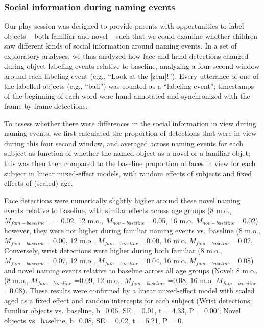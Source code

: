 \documentclass[english,man]{apa6}
\begin{document}
\subsubsection{Social information during naming
events}\label{social-information-during-naming-events}

Our play session was designed to provide parents with opportunities to
label objects -- both familiar and novel -- such that we could examine
whether children saw different kinds of social information around naming
events. In a set of exploratory analyses, we thus analyzed how face and
hand detections changed during object labeling events relative to
baseline, analyzing a four-second window around each labeling event
(e.g., \enquote{Look at the {[}zem{]}!}). Every utterance of one of the
labelled objects (e.g., \enquote{ball}) was counted as a
\enquote{labeling event}; timestamps of the beginning of each word were
hand-annotated and synchronized with the frame-by-frame detections.

To assess whether there were differences in the social information in
view during naming events, we first calculated the proportion of
detections that were in view during this four second window, and
averaged across naming events for each subject as function of whether
the named object as a novel or a familiar objet; this was then then
compared to the baseline proportion of faces in view for each subject in
linear mixed-effect models, with random effects of subjects and fixed
effects of (scaled) age.

Face detections were numerically slightly higher around these novel
naming events relative to baseline, with similar effects across age
groups (8 m.o., \(M_{fam - baseline}\) = =0.02, 12 m.o.,
\(M_{nov - baseline}\) =0.05, 16 m.o. \(M_{nov - baseline}\) =0.02)
however, they were not higher during familiar naming events vs.~baseline
(8 m.o., \(M_{fam - baseline}\) =0.00, 12 m.o., \(M_{fam - baseline}\)
=0.00, 16 m.o. \(M_{fam - baseline}\) =0.02, Conversely, wrist
detections were higher during both familiar (8 m.o.,
\(M_{fam - baseline}\) =0.07, 12 m.o., \(M_{fam - baseline}\) =0.04, 16
m.o. \(M_{fam - baseline}\) =0.08) and novel naming events relative to
baseline across all age groups (Novel; 8 m.o., (8 m.o.,
\(M_{fam - baseline}\) =0.09, 12 m.o., \(M_{fam - baseline}\) =0.08, 16
m.o. \(M_{fam - baseline}\) =0.08). These results were confirmed by a
linear mixed-effect model with scaled aged as a fixed effect and random
intercepts for each subject (Wrist detections; familiar objects
vs.~baseline, b=0.06, SE = 0.01, t = 4.33, P = 0.00'; Novel objects
vs.~baseline, b=0.08, SE = 0.02, t = 5.21, P = 0.
\end{document}

